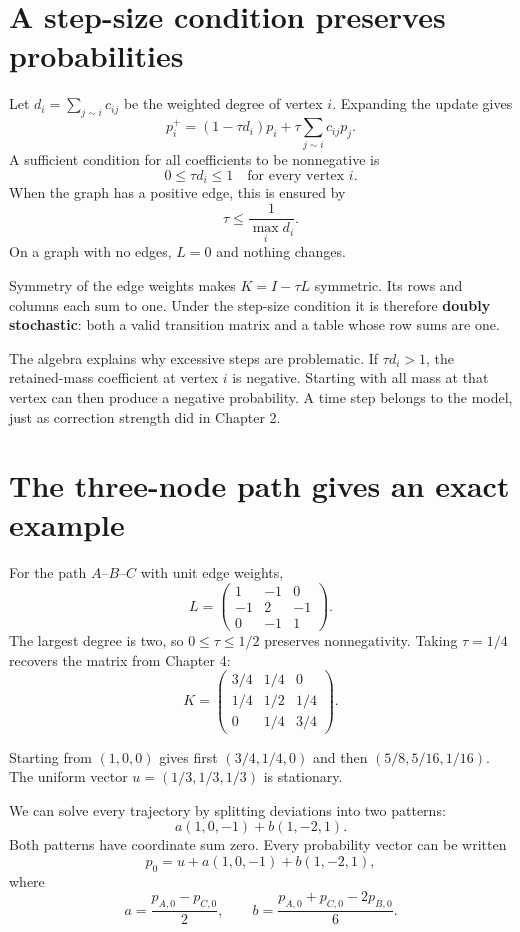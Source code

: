 \documentclass[11pt,oneside,openany]{book}
\theoremstyle{definition}
\theoremstyle{remark}
\numberwithin{equation}{chapter}
\begin{document}
\section{A step-size condition preserves probabilities}\label{ch10-a-step-size-condition-preserves-probabilities}

Let \(d_i=\sum_{j\sim i}c_{ij}\) be the weighted degree of vertex \(i\). Expanding the update gives \[p_i^+=(1-\tau d_i)p_i+\tau\sum_{j\sim i}c_{ij}p_j.\] A sufficient condition for all coefficients to be nonnegative is \[0\leq\tau d_i\leq1\quad\text{for every vertex }i.\] When the graph has a positive edge, this is ensured by \[\tau\leq\frac1{\max_i d_i}.\] On a graph with no edges, \(L=0\) and nothing changes.

Symmetry of the edge weights makes \(K=I-\tau L\) symmetric. Its rows and columns each sum to one. Under the step-size condition it is therefore \textbf{doubly stochastic}: both a valid transition matrix and a table whose row sums are one.

The algebra explains why excessive steps are problematic. If \(\tau d_i>1\), the retained-mass coefficient at vertex \(i\) is negative. Starting with all mass at that vertex can then produce a negative probability. A time step belongs to the model, just as correction strength did in Chapter 2.

\section{The three-node path gives an exact example}\label{ch10-the-three-node-path-gives-an-exact-example}

For the path \(A\)--\(B\)--\(C\) with unit edge weights, \[L=\begin{pmatrix}1&-1&0\\-1&2&-1\\0&-1&1\end{pmatrix}.\] The largest degree is two, so \(0\leq\tau\leq1/2\) preserves nonnegativity. Taking \(\tau=1/4\) recovers the matrix from Chapter 4: \[K=\begin{pmatrix}3/4&1/4&0\\1/4&1/2&1/4\\0&1/4&3/4\end{pmatrix}.\]

Starting from \((1,0,0)\) gives first \((3/4,1/4,0)\) and then \((5/8,5/16,1/16)\). The uniform vector \(u=(1/3,1/3,1/3)\) is stationary.

We can solve every trajectory by splitting deviations into two patterns: \[a(1,0,-1)+b(1,-2,1).\] Both patterns have coordinate sum zero. Every probability vector can be written \[p_0=u+a(1,0,-1)+b(1,-2,1),\] where \[a=\frac{p_{A,0}-p_{C,0}}2,\qquad
b=\frac{p_{A,0}+p_{C,0}-2p_{B,0}}6.\]
\end{document}
